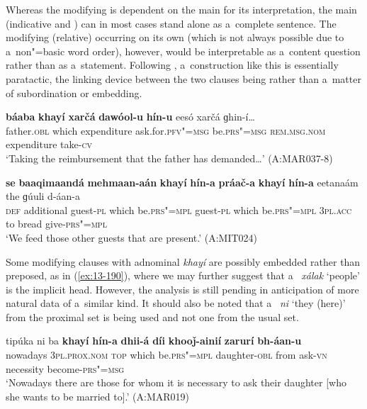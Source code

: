 Whereas the modifying  is dependent on the main  for its interpretation, the main (indicative and )  can in most cases stand alone as a~complete sentence. The modifying (relative)  occurring on its own (which is not always possible due to a~non"=basic word order), however, would be interpretable as a~content question rather than as a~statement. Following \citet[182]{givon2001b}, a~construction like this is essentially paratactic, the linking device between the two clauses being  rather than a~matter of subordination or embedding.

\begin{exe}
\ex
\label{ex:13-188}
\gll \textbf{báaba} \textbf{khayí} \textbf{xarčá} \textbf{dawóol-u} \textbf{hín-u}  eesó xarčá ɡhin-í{\ldots}  \\
father.\textsc{obl} which expenditure ask.for.\textsc{pfv"=msg} be.\textsc{prs"=msg} \textsc{rem.msg.nom} expenditure take-\textsc{cv} \\
\glt `Taking the reimbursement that the father has demanded{\ldots}' (A:MAR037-8)

\ex
\label{ex:13-189}
\gll \textbf{se} \textbf{baaqimaandá} \textbf{mehmaan-aán} \textbf{khayí} \textbf{hín-a} \textbf{práač-a} \textbf{khayí} \textbf{hín-a} eetanaám the ɡúuli d-áan-a\\
\textsc{def} additional guest-\textsc{pl} which be.\textsc{prs"=mpl} guest-\textsc{pl} which be.\textsc{prs"=mpl} \textsc{3pl.acc} to bread give-\textsc{prs"=mpl} \\
\glt `We feed those other guests that are present.' (A:MIT024) 
\end{exe}

Some modifying clauses with adnominal \textit{khayí} are possibly embedded rather than preposed, as in (\ref{ex:13-190}), where we may further suggest that a~ \textit{xálak} `people' is the implicit head. However, the analysis is still pending in anticipation of more natural data of a~similar kind. It should also be noted that a~ \textit{ni} `they (here)' from the proximal set is being used and not one from the usual  set.

\ea
\label{ex:13-190}
\gll tipúka ni ba \textbf{khayí} \textbf{hín-a} \textbf{dhii-á} \textbf{díi} \textbf{khooǰ-ainií} \textbf{zarurí} \textbf{bh-áan-u}\\
nowadays \textsc{3pl.prox.nom} \textsc{top} which be.\textsc{prs"=mpl}  daughter-\textsc{obl} from ask-\textsc{vn} necessity become-\textsc{prs"=msg}\\
\glt `Nowadays there are those for whom it is necessary to ask their daughter [who she wants to be married to].' (A:MAR019) 
\z

